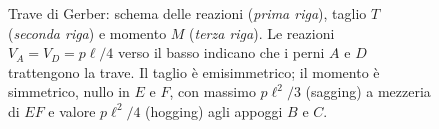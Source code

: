 \begin{figure}[htbp]
{
}%
\caption{Trave di Gerber: schema delle reazioni (\emph{prima riga}),
	taglio $T$ (\emph{seconda riga}) e momento $M$ (\emph{terza riga}).
	Le reazioni $V_A=V_D=p\ell/4$ verso il basso indicano che i perni $A$ e $D$
	trattengono la trave. Il taglio è emisimmetrico; il momento è simmetrico,
	nullo in $E$ e $F$, con massimo $p\ell^2/3$ (sagging) a mezzeria di $EF$
	e valore $p\ell^2/4$ (hogging) agli appoggi $B$ e $C$.}
\label{fig:gerber_esempio_diagrammi}
\end{figure}
